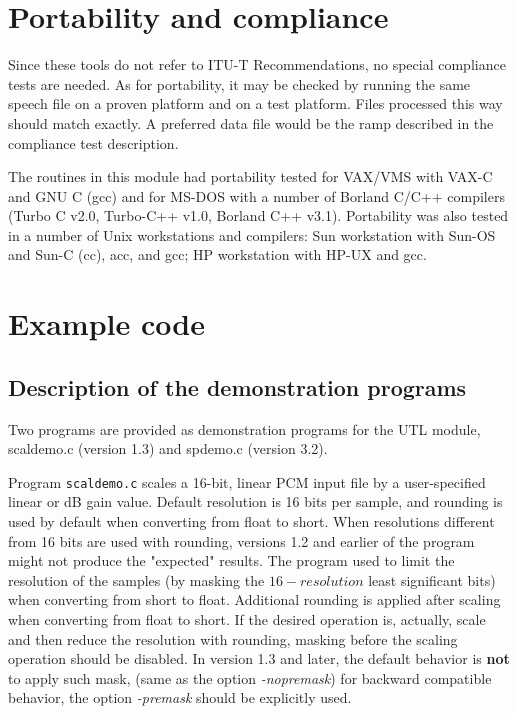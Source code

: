 \section{Portability and compliance} \label{Utl-port}

Since these tools do not refer to ITU-T Recommendations, no special
compliance tests are needed. As for portability, it may be checked by
running the same speech file on a proven platform and on a test
platform. Files processed this way should match exactly. A preferred
data file would be the ramp described in the compliance test
description.

The routines in this module had portability tested for VAX/VMS with
VAX-C and GNU C (gcc) and for MS-DOS with a number of Borland C/C++
compilers (Turbo C v2.0, Turbo-C++ v1.0, Borland C++ v3.1).
Portability was also tested in a number of Unix workstations and
compilers: Sun workstation with Sun-OS and Sun-C (cc), acc, and gcc;
HP workstation with HP-UX and gcc.


\section{Example code}

\subsection {Description of the demonstration programs}

Two programs are provided as demonstration programs for the UTL module,
scaldemo.c (version 1.3) and spdemo.c (version 3.2).

Program {\tt scaldemo.c} scales a 16-bit, linear PCM input file by a
user-specified linear or dB gain value. Default resolution is 16 bits
per sample, and rounding is used by default when converting from float
to short. When resolutions different from 16 bits are used with
rounding, versions 1.2 and earlier of the program might not produce
the "expected" results. The program used to limit the resolution of
the samples (by masking the $16-resolution$ least significant bits)
when converting from short to float. Additional rounding is applied
after scaling when converting from float to short. If the desired
operation is, actually, scale and then reduce the resolution with
rounding, masking before the scaling operation should be disabled. In
version 1.3 and later, the default behavior is {\bf not} to apply such
mask, (same as the option {\em -nopremask}) for backward compatible
behavior, the option {\em -premask} should be explicitly used.

